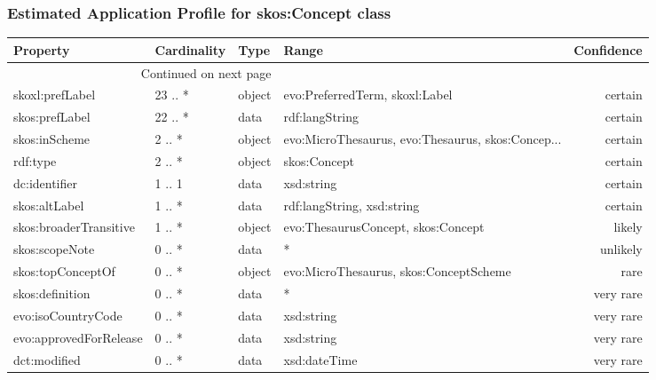 \documentclass[10pt,a4paper,titlepage,final]{article}
\begin{document}
\subsubsection{Estimated Application Profile for skos:Concept class}
\begin{tabularx}{\textwidth}{lllXr}
\toprule
               Property & Cardinality &    Type &                                              Range & Confidence \\
\midrule
\endhead
\midrule
\multicolumn{3}{r}{{Continued on next page}} \\
\midrule
\endfoot

\bottomrule
\endlastfoot
        skoxl:prefLabel &     23 .. * &  object &                     evo:PreferredTerm, skoxl:Label &    certain \\
         skos:prefLabel &     22 .. * &    data &                                     rdf:langString &    certain \\
          skos:inScheme &      2 .. * &  object &  evo:MicroThesaurus, evo:Thesaurus, skos:Concep... &    certain \\
               rdf:type &      2 .. * &  object &                                       skos:Concept &    certain \\
          dc:identifier &      1 .. 1 &    data &                                         xsd:string &    certain \\
          skos:altLabel &      1 .. * &    data &                         rdf:langString, xsd:string &    certain \\
 skos:broaderTransitive &      1 .. * &  object &                 evo:ThesaurusConcept, skos:Concept &     likely \\
         skos:scopeNote &      0 .. * &    data &                                                  * &   unlikely \\
      skos:topConceptOf &      0 .. * &  object &             evo:MicroThesaurus, skos:ConceptScheme &       rare \\
        skos:definition &      0 .. * &    data &                                                  * &  very rare \\
     evo:isoCountryCode &      0 .. * &    data &                                         xsd:string &  very rare \\
 evo:approvedForRelease &      0 .. * &    data &                                         xsd:string &  very rare \\
           dct:modified &      0 .. * &    data &                                       xsd:dateTime &  very rare \\

\end{tabularx}
\end{document}
